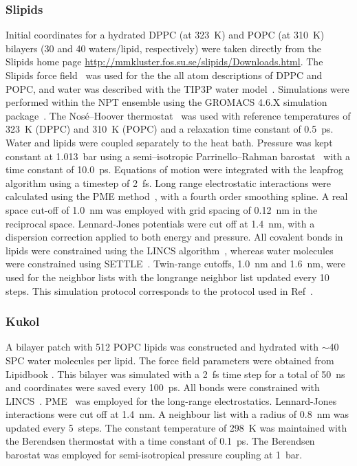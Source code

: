 \documentclass[journal=jacsat,manuscript=article]{achemso}
\begin{document}
\subsubsection{Slipids}
Initial coordinates for a hydrated DPPC (at 323~K) and POPC (at 310~K) bilayers (30 and 40 waters/lipid, respectively) were taken directly from the 
Slipids home page \url{http://mmkluster.fos.su.se/slipids/Downloads.html}.  The Slipids force field~\cite{jambeck12,jambeck12b} was used for the the all atom descriptions of DPPC and POPC, and
water was described with the TIP3P water model~\cite{jorgensen83}. Simulations were performed within the NPT ensemble using the GROMACS 4.6.X simulation
package~\cite{hess08}. The Nos\'{e}--Hoover thermostat~\cite{nose84,hoover85} was used with reference temperatures of
323~K (DPPC) and 310~K (POPC) and a relaxation time constant of 0.5~ps. Water and lipids were coupled separately to
the heat bath. Pressure was kept constant at 1.013~bar using a semi--isotropic Parrinello--Rahman
barostat~\cite{parrinello81} with a time constant of 10.0~ps. Equations of motion were
integrated with the leapfrog algorithm using a timestep of 2~fs. Long range
electrostatic interactions were calculated using the PME method~\cite{darden93,essman95}, with a fourth order
smoothing spline. A real space cut-off of 1.0~nm was employed with grid spacing of 0.12~nm in the reciprocal space.
Lennard-Jones potentials were cut off at 1.4~nm, with a dispersion correction applied to both energy and pressure. All covalent bonds in lipids were constrained using the LINCS algorithm~\cite{hess97}, 
whereas water molecules were constrained using SETTLE~\cite{miyamoto92}. Twin-range cutoffs,
1.0~nm and 1.6~nm, were used for the neighbor lists with the longrange neighbor list updated every
10 steps. This simulation protocol corresponds to the protocol used in Ref~\cite{jambeck13}. 

\subsubsection{Kukol}
A bilayer patch with 512 POPC lipids was constructed and hydrated with $\sim$40 SPC water molecules per lipid. 
The force field parameters were obtained from Lipidbook \cite{domanski10}.
This bilayer was simulated with a 2~fs time step for a total of 50~ns and coordinates were saved every 100~ps. 
All bonds were constrained with LINCS~\cite{hess97,hess07}. PME~\cite{darden93,essman95} was employed for the long-range electrostatics. Lennard-Jones interactions 
were cut off at 1.4~nm. A neighbour list with a radius of 0.8~nm was updated every 5~steps. The constant temperature of 298~K 
was maintained with the Berendsen thermostat \cite{berendsen84} with a time constant of 0.1~ps. The Berendsen barostat \cite{berendsen84} 
was employed for semi-isotropical pressure coupling at 1~bar.
\end{document}
